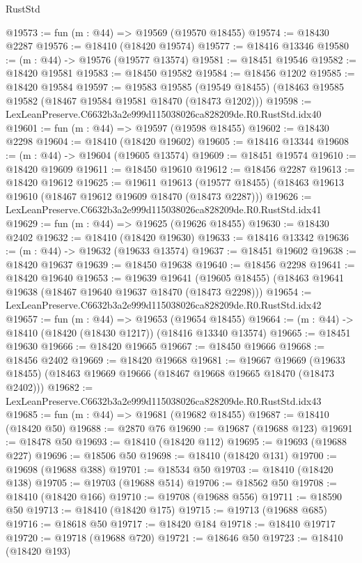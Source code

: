 \begin{lexlean}{RustStd}
\begin{coremodule}
@19573 := fun (m : @44) => @19569 (@19570 @18455)
@19574 := @18430 @2287
@19576 := @18410 (@18420 @19574)
@19577 := @18416 @13346
@19580 := (m : @44) -> @19576 (@19577 @13574)
@19581 := @18451 @19546
@19582 := @18420 @19581
@19583 := @18450 @19582
@19584 := @18456 @1202
@19585 := @18420 @19584
@19597 := @19583
    @19585
    (@19549 @18455)
    (@18463 @19585 @19582 (@18467 @19584 @19581 @18470 (@18473 @1202)))
@19598 := LexLeanPreserve.C6632b3a2e999d115038026ca828209de.R0.RustStd.idx40
@19601 := fun (m : @44) => @19597 (@19598 @18455)
@19602 := @18430 @2298
@19604 := @18410 (@18420 @19602)
@19605 := @18416 @13344
@19608 := (m : @44) -> @19604 (@19605 @13574)
@19609 := @18451 @19574
@19610 := @18420 @19609
@19611 := @18450 @19610
@19612 := @18456 @2287
@19613 := @18420 @19612
@19625 := @19611
    @19613
    (@19577 @18455)
    (@18463 @19613 @19610 (@18467 @19612 @19609 @18470 (@18473 @2287)))
@19626 := LexLeanPreserve.C6632b3a2e999d115038026ca828209de.R0.RustStd.idx41
@19629 := fun (m : @44) => @19625 (@19626 @18455)
@19630 := @18430 @2402
@19632 := @18410 (@18420 @19630)
@19633 := @18416 @13342
@19636 := (m : @44) -> @19632 (@19633 @13574)
@19637 := @18451 @19602
@19638 := @18420 @19637
@19639 := @18450 @19638
@19640 := @18456 @2298
@19641 := @18420 @19640
@19653 := @19639
    @19641
    (@19605 @18455)
    (@18463 @19641 @19638 (@18467 @19640 @19637 @18470 (@18473 @2298)))
@19654 := LexLeanPreserve.C6632b3a2e999d115038026ca828209de.R0.RustStd.idx42
@19657 := fun (m : @44) => @19653 (@19654 @18455)
@19664 := (m : @44) -> @18410 (@18420 (@18430 @1217)) (@18416 @13340 @13574)
@19665 := @18451 @19630
@19666 := @18420 @19665
@19667 := @18450 @19666
@19668 := @18456 @2402
@19669 := @18420 @19668
@19681 := @19667
    @19669
    (@19633 @18455)
    (@18463 @19669 @19666 (@18467 @19668 @19665 @18470 (@18473 @2402)))
@19682 := LexLeanPreserve.C6632b3a2e999d115038026ca828209de.R0.RustStd.idx43
@19685 := fun (m : @44) => @19681 (@19682 @18455)
@19687 := @18410 (@18420 @50)
@19688 := @2870 @76
@19690 := @19687 (@19688 @123)
@19691 := @18478 @50
@19693 := @18410 (@18420 @112)
@19695 := @19693 (@19688 @227)
@19696 := @18506 @50
@19698 := @18410 (@18420 @131)
@19700 := @19698 (@19688 @388)
@19701 := @18534 @50
@19703 := @18410 (@18420 @138)
@19705 := @19703 (@19688 @514)
@19706 := @18562 @50
@19708 := @18410 (@18420 @166)
@19710 := @19708 (@19688 @556)
@19711 := @18590 @50
@19713 := @18410 (@18420 @175)
@19715 := @19713 (@19688 @685)
@19716 := @18618 @50
@19717 := @18420 @184
@19718 := @18410 @19717
@19720 := @19718 (@19688 @720)
@19721 := @18646 @50
@19723 := @18410 (@18420 @193)

\end{coremodule}
\end{lexlean}

